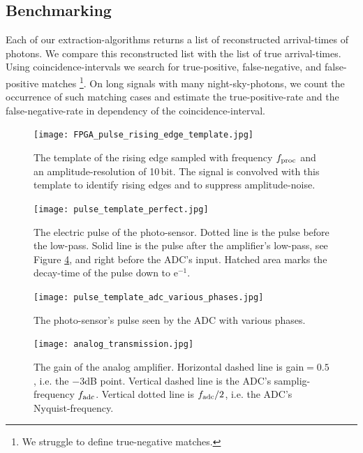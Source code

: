 \documentclass{article}%
\begin{document}
\begin{multicols}{2}
\subsection*{Benchmarking}%
%
Each of our extraction-algorithms returns a list of reconstructed arrival-times of photons.
%
We compare this reconstructed list with the list of true arrival-times.
%
Using coincidence-intervals we search for true-positive, false-negative, and false-positive matches \footnote{We struggle to define true-negative matches.}.
%
On long signals with many night-sky-photons, we count the occurrence of such matching cases and estimate the true-positive-rate and the false-negative-rate in dependency of the coincidence-interval.
%
\begin{figure}[H]%
\centering%
\texttt{[image: FPGA\_pulse\_rising\_edge\_template.jpg]}%
\caption{
The template of the rising edge sampled with frequency $f_\text{proc}{}$ and an amplitude-resolution of 10\,bit. The signal is convolved with this template to identify rising edges and to suppress amplitude-noise.
}%
\label{FigSimRisingEdgeTemplate}
\end{figure}
%
\begin{figure}[H]%
\centering%
\texttt{[image: pulse\_template\_perfect.jpg]}%
\caption{
The electric pulse of the photo-sensor.
%
Dotted line is the pulse before the low-pass.
%
Solid line is the pulse after the amplifier's low-pass, see Figure \ref{FigSimAnalogTransmission}, and right before the ADC's input.
%
Hatched area marks the decay-time of the pulse down to $\mathrm{e}^{-1}$.
}%
\label{FigSimPulseTemplate}
\end{figure}
%
\begin{figure}[H]%
\centering%
\texttt{[image: pulse\_template\_adc\_various\_phases.jpg]}%
\caption{
The photo-sensor's pulse seen by the ADC with various phases.
}%
\label{FigSimPulsePhases}
\end{figure}
%
\begin{figure}[H]%
\centering%
\texttt{[image: analog\_transmission.jpg]}%
\caption{
The gain of the analog amplifier.
%
Horizontal dashed line is gain$=0.5$, i.e. the $-3$dB point.
%
Vertical dashed line is the ADC's samplig-frequency $f_\text{adc}{}$.
%
Vertical dotted line is $f_\text{adc}{}/2$, i.e. the ADC's Nyquist-frequency.
}%
\label{FigSimAnalogTransmission}
\end{figure}
%

\end{multicols}
\end{document}
